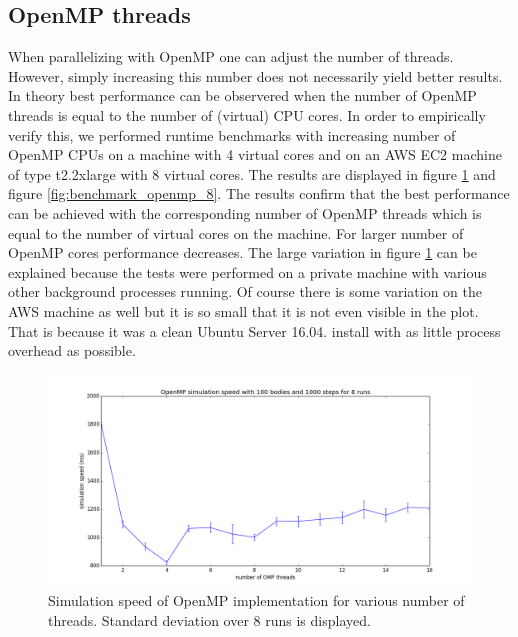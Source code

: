 \documentclass[a4paper,11pt]{scrartcl} %
\begin{document}
\subsection{OpenMP threads}
When parallelizing with OpenMP one can adjust the number of threads. However, simply increasing this number does not necessarily yield better results. In theory best performance can be observered when the number of OpenMP threads is equal to the number of (virtual) CPU cores. In order to empirically verify this, we performed runtime benchmarks with increasing number of OpenMP CPUs on a machine with 4 virtual cores and on an AWS EC2 machine of type t2.2xlarge with 8 virtual cores. The results are displayed in figure \ref{fig:benchmark_openmp} and figure \ref{fig:benchmark_openmp_8}. The results confirm that the best performance can be achieved with the corresponding number of OpenMP threads which is equal to the number of virtual cores on the machine. For larger number of OpenMP cores performance decreases. The large variation in figure \ref{fig:benchmark_openmp} can be explained because the tests were performed on a private machine with various other background processes running. Of course there is some variation on the AWS machine as well but it is so small that it is not even visible in the plot. That is because it was a clean Ubuntu Server 16.04. install with as little process overhead as possible.

\begin{figure}[h!]
  \centering
  \includegraphics[width=\textwidth]{img/benchmark_omp.png}
  \caption{Simulation speed of OpenMP implementation for various number of threads. Standard deviation over 8 runs is displayed.}
  \label{fig:benchmark_openmp}
\end{figure}
\end{document}
